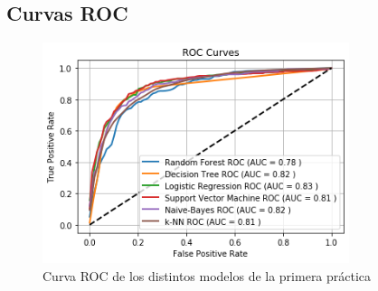 \subsection{Curvas ROC}

\begin{figure}[H]
\centering
\includegraphics[width=0.8\textwidth]{imagenes/roc_curve.png}
\caption{Curva ROC de los distintos modelos de la primera práctica}
\end{figure}

